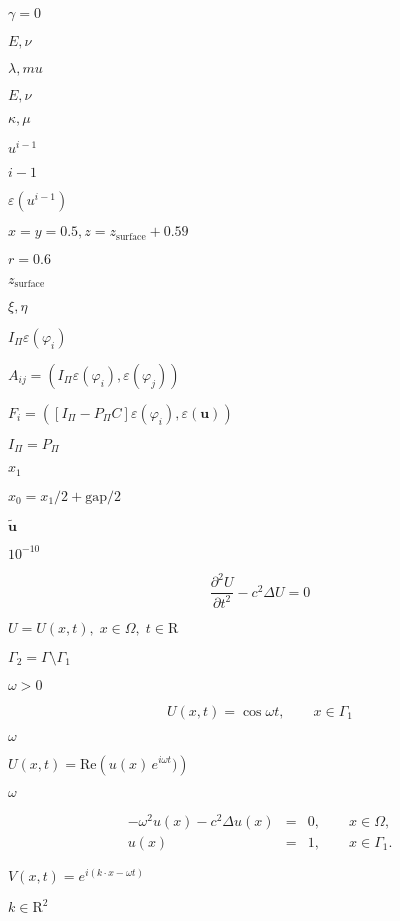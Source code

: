 \documentclass{article}
\begin{document}
$\gamma = 0$
\pagebreak

$E, \nu$
\pagebreak

$\lambda,mu$
\pagebreak

$E,\nu$
\pagebreak

$\kappa,\mu$
\pagebreak

$u^{i-1}$
\pagebreak

$i-1$
\pagebreak

$\varepsilon(u^{i-1})$
\pagebreak

$x=y=0.5, z=z_{\text{surface}}+0.59$
\pagebreak

$r=0.6$
\pagebreak

$z_{\text{surface}}$
\pagebreak

$\xi,\eta$
\pagebreak

$I_\Pi\varepsilon(\varphi_i)$
\pagebreak

$A_{ij}=(I_\Pi\varepsilon(\varphi_i),\varepsilon(\varphi_j))$
\pagebreak

$F_i=([I_\Pi-P_\Pi C]\varepsilon(\varphi_i),\varepsilon(\mathbf u))$
\pagebreak

$I_\Pi=P_\Pi$
\pagebreak

$x_1$
\pagebreak

$x_0 = x_1/2 + \text{gap}/2$
\pagebreak

$\tilde{\mathbf u}$
\pagebreak

$10^{-10}$
\pagebreak

\[ \frac{\partial^2 U}{\partial t^2} - c^2 \Delta U = 0 \]
\pagebreak

$U = U(x,t),\;x \in \Omega,\;t\in\mathrm{R}$
\pagebreak

$\Gamma_2=\Gamma\setminus\Gamma_1$
\pagebreak

${\omega}>0$
\pagebreak

\[ U(x,t) = \cos{\omega t}, \qquad x\in \Gamma_1 \]
\pagebreak

$\omega$
\pagebreak

$U(x,t) = \textrm{Re}\left(u(x)\,e^{i\omega t})\right)$
\pagebreak

${\omega}$
\pagebreak

\begin{eqnarray*} -\omega^2 u(x) - c^2\Delta u(x) &=& 0, \qquad x\in\Omega,\\ u(x) &=& 1, \qquad x\in\Gamma_1. \end{eqnarray*}
\pagebreak

$V(x,t)=e^{i(k\cdot x -\omega t)}$
\pagebreak

$k\in {\mathrm{R}^2}$
\pagebreak
\end{document}
